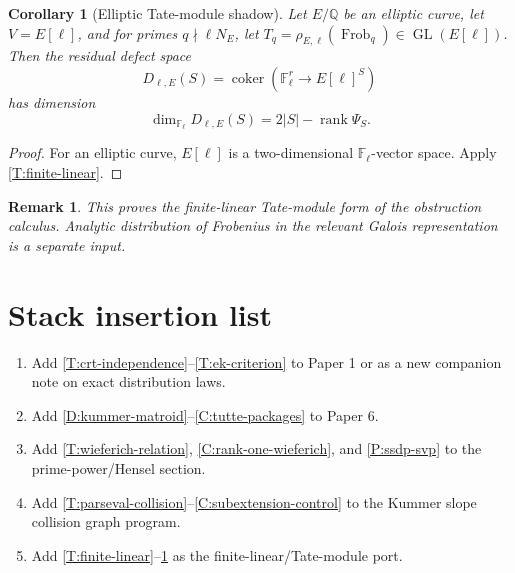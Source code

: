 \documentclass[11pt]{article}
\newtheorem{corollary}{Corollary}
\newtheorem{remark}{Remark}
\newcommand{\Q}{\mathbb Q}
\newcommand{\F}{\mathbb F}
\newcommand{\Frob}{\operatorname{Frob}}
\newcommand{\rank}{\operatorname{rank}}
\newcommand{\coker}{\operatorname{coker}}
\begin{document}
\begin{corollary}[Elliptic Tate-module shadow]\label{C:tate-shadow}
Let \(E/\Q\) be an elliptic curve, let \(V=E[\ell]\), and for primes \(q\nmid \ell N_E\), let \(T_q=\rho_{E,\ell}(\Frob_q)\in\operatorname{GL}(E[\ell])\).  Then the residual defect space
\[
D_{\ell,E}(S)=\coker\left(\F_\ell^r\to E[\ell]^S\right)
\]
has dimension
\[
\dim_{\F_\ell}D_{\ell,E}(S)=2|S|-\rank\Psi_S.
\]
\end{corollary}

\begin{proof}
For an elliptic curve, \(E[\ell]\) is a two-dimensional \(\F_\ell\)-vector space.  Apply \cref{T:finite-linear}.
\end{proof}

\begin{remark}
This proves the finite-linear Tate-module form of the obstruction calculus.  Analytic distribution of Frobenius in the relevant Galois representation is a separate input.
\end{remark}

\section{Stack insertion list}

\begin{enumerate}[leftmargin=1.5em]
\item Add \cref{T:crt-independence}--\cref{T:ek-criterion} to Paper 1 or as a new companion note on exact distribution laws.
\item Add \cref{D:kummer-matroid}--\cref{C:tutte-packages} to Paper 6.
\item Add \cref{T:wieferich-relation}, \cref{C:rank-one-wieferich}, and \cref{P:ssdp-svp} to the prime-power/Hensel section.
\item Add \cref{T:parseval-collision}--\cref{C:subextension-control} to the Kummer slope collision graph program.
\item Add \cref{T:finite-linear}--\cref{C:tate-shadow} as the finite-linear/Tate-module port.
\end{enumerate}
\end{document}
